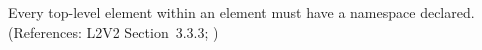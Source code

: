 Every top-level element within an  element must have a
namespace declared.  (References: L2V2 Section~3.3.3;
)
